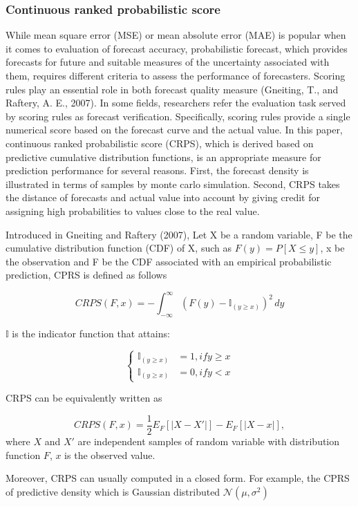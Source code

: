 \documentclass[12pt,a4paper]{article}
\numberwithin{equation}{section}
\begin{document}
\subsubsection{Continuous ranked probabilistic score}
While mean square error (MSE) or mean absolute error (MAE) is popular when it comes to evaluation of forecast accuracy, probabilistic forecast, which provides forecasts for future and suitable measures of the uncertainty associated with them, requires different criteria to assess the performance of forecasters. Scoring rules play an essential role in both forecast quality measure (Gneiting, T., and  Raftery, A. E., 2007). In some fields, researchers refer the evaluation task served by scoring rules as forecast verification. Specifically, scoring rules provide a single numerical score based on the forecast curve and the actual value. In this paper, continuous ranked probabilistic score (CRPS), which is derived based on predictive cumulative distribution functions, is an appropriate measure for prediction performance for several reasons. First, the forecast density is illustrated in terms of samples by monte carlo simulation. Second, CRPS takes the distance of forecasts and actual value into account by giving credit for assigning high probabilities to values close to the real value. 

Introduced in Gneiting and  Raftery (2007), Let X be a random variable, F be the cumulative distribution function (CDF) of X, such as $F(y) = P [X \leq y]$, x be the observation and F be the CDF associated with an empirical probabilistic prediction, CPRS is defined as follows

\[CRPS(F,x) = - \int_{-\infty}^{\infty}  (F(y) - \mathbb{I}_{(y \geq x)}) ^2 \,dy\]

$\mathbb{I}$ is the indicator function that attains:

\begin{equation*}
\begin{cases}
\mathbb{I}_{(y \geq x)} &= 1, if y \geq x\\
\mathbb{I}_{(y \geq x)} &= 0, if y < x
\end{cases}
\end{equation*}

CRPS can be equivalently written as 

\[CRPS(F, x) =  \frac{1}{2} E_F [|X-X'|] - E_F [|X-x|],\]
 where $X$ and $X'$ are independent samples of random variable with distribution function $F$, $x$ is the observed value.
 
 Moreover, CRPS can usually computed in a closed form. For example, the CPRS of predictive density which is Gaussian distributed $\mathcal{N}(\mu, \sigma^2)$
 
\end{document}
